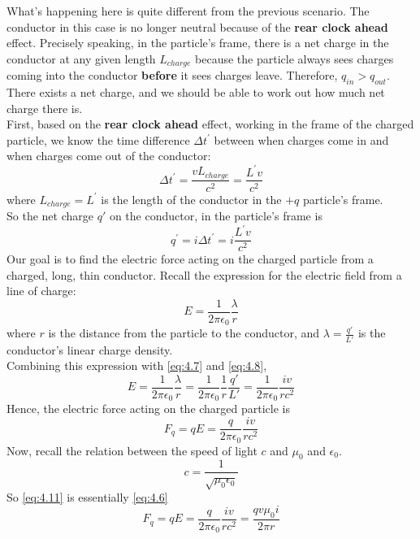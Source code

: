 \documentclass[a4paper,11pt]{article}
\numberwithin{equation}{section}
\begin{document}
 \noindent What's happening here is quite different from the previous scenario. The conductor in this case is no longer neutral because of the \textbf{rear clock ahead} effect. Precisely speaking, in the particle's frame, there is a net charge in the conductor at any given length $L_{charge}$ because the particle always sees charges coming into the conductor \textbf{before} it sees charges leave. Therefore, $q_{in} > q_{out}$. There exists a net charge, and we should be able to work out how much net charge there is.\\
 First, based on the \textbf{rear clock ahead} effect, working in the frame of the charged particle, we know the time difference $\Delta t^{\prime}$ between when charges come in and when charges come out of the conductor:
 \begin{equation} \label{eq:4.7}
 \Delta t^{\prime}=\frac{vL_{charge}}{c^2}=\frac{L^{\prime}v}{c^2}
 \end{equation}
 where $L_{charge}=L^{\prime}$ is the length of the conductor in the $+q$ particle's frame.\\ 
 \noindent So the net charge $q'$ on the conductor, in the particle's frame is
 \begin{equation} \label{eq:4.8}
 q^{\prime}=i\Delta t^{\prime}=i\frac{L^{\prime}v}{c^2}
 \end{equation}
 Our goal is to find the electric force acting on the charged particle from a charged, long, thin conductor. Recall the expression for the electric field from a line of charge:
 \begin{equation} \label{eq:4.9}
 E=\frac{1}{2\pi\epsilon_{0}}\frac{\lambda}{r}
 \end{equation}
 where $r$ is the distance from the particle to the conductor, and $\lambda=\frac{q'}{L'}$ is the conductor's linear charge density. \\
 Combining this expression with \eqref{eq:4.7} and \eqref{eq:4.8},
 \begin{equation} \label{eq:4.10}
 E=\frac{1}{2\pi\epsilon_{0}}\frac{\lambda}{r}=\frac{1}{2\pi\epsilon_{0}}\frac{1}{r}\frac{q'}{L'}=\frac{1}{2\pi\epsilon_{0}}\frac{iv}{rc^2}
 \end{equation}
 Hence, the electric force acting on the charged particle is
 \begin{equation}\label{eq:4.11}
 F_{q}=qE=\frac{q}{2\pi\epsilon_{0}}\frac{iv}{rc^2}
 \end{equation}
 Now, recall the relation between the speed of light $c$ and $\mu_{0}$ and $\epsilon_{0}$.
 \begin{equation}\label{eq:4.12}
 c=\frac{1}{\sqrt{\mu_{0}\epsilon_{0}}}
 \end{equation}
 So \eqref{eq:4.11} is essentially \eqref{eq:4.6}
 \begin{equation}\label{4.13}
 F_{q}=qE=\frac{q}{2\pi\epsilon_{0}}\frac{iv}{rc^2}=\frac{qv\mu_{0} i}{2\pi r}
 \end{equation}
 
\end{document}
